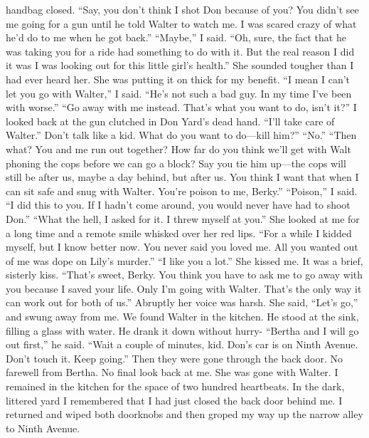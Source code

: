 \documentclass{novel}
\begin{document}
handbag closed. “Say, you don’t think I shot Don because of you? You didn’t see me going for a gun until he told Walter to watch me. I was scared crazy of what he’d do to me when he got back.” “Maybe,” I said. “Oh, sure, the fact that he was taking you for a ride had something to do with it. But the real reason I did it was I was looking out for this little girl’s health.” She sounded tougher than I had ever heard her. She was putting it on thick for my benefit. “I mean I can’t let you go with Walter,” I said. “He’s not such a bad guy. In my time I’ve been with worse.” “Go away with me instead. That’s what you want to do, isn’t it?” I looked back at the gun clutched in Don Yard’s dead hand. “I’ll take care of Walter.” Don’t talk like a kid. What do you want to do—kill him?” “No.” “Then what? You and me run out together? How far do you think we’ll get with Walt phoning the cops before we can go a block? Say you tie him up—the cops will still be after us, maybe a day behind, but after us. You think I want that when I can sit safe and snug with Walter. You’re poison to me, Berky.” “Poison,” I said. “I did this to you. If I hadn’t come around, you would never have had to shoot Don.” “What the hell, I asked for it. I threw myself at you.” She looked at me for a long time and a remote smile whisked over her red lips. “For a while I kidded myself, but I know better now. You never said you loved me. All you wanted out of me was dope on Lily’s murder.” “I like you a lot.” She kissed me. It was a brief, sisterly kiss. “That’s sweet, Berky. You think you have to ask me to go away with you because I saved your life. Only I’m going with Walter. That’s the only way it can work out for both of us.” Abruptly her voice was harsh. She said, “Let’s go,” and swung away from me. We found Walter in the kitchen. He stood at the sink, filling a glass with water. He drank it down without hurry- “Bertha and I will go out first,” he said. “Wait a couple of minutes, kid. Don’s car is on Ninth Avenue. Don’t touch it. Keep going.” Then they were gone through the back door. No farewell from Bertha. No final look back at me. She was gone with Walter. I remained in the kitchen for the space of two hundred heartbeats. In the dark, littered yard I remembered that I had just closed the back door behind me. I returned and wiped both doorknobs and then groped my way up the narrow alley to Ninth Avenue.


\begin{ChapterStart}

\vspace{3\nbs}
\end{ChapterStart}
\end{document}
